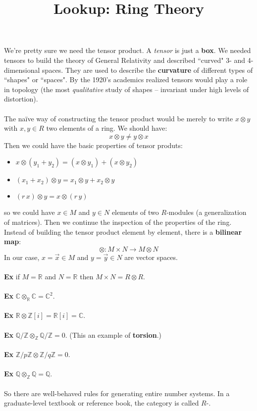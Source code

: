 \documentclass[12pt]{article}
\title{Lookup: Ring Theory}
\date{}
\begin{document}
\sffamily

\maketitle

{\fontsize{16pt}{16pt}\selectfont 

\noindent We're pretty sure we need the tensor product.  A \textit{tensor} is just a \textbf{box}.  We needed tensors to build the theory of General Relativity and described ``curved" 3- and 4-dimensional spaces.  They are used to describe the \textbf{curvature} of different types of ``shapes" or ``spaces".  By the 1920's academics realized tensors would play a role in topology (the most \textit{qualitative} study of shapes -- invariant under high levels of distortion).  \\ \\
The na\"{i}ve way of constructing the tensor product would be merely to write $x \otimes y$ with $x, y \in R$ two elements of a ring.  We should have:
$$ x \otimes y \neq y \otimes x $$
Then we could have the basic properties of tensor produts:
\begin{itemize}
\item $x \otimes (y_1 + y_2) = (x \otimes y_1) + (x \otimes y_2)$
\item $(x_1 + x_2) \otimes y = x_1 \otimes y + x_2 \otimes  y$
\item $(r\, x ) \otimes y = x \otimes (r \, y)$
\end{itemize}
so we could have $x \in M$ and $y \in N$ elements of two $R$-modules (a generalization of matrices).  Then we continue the inspection of the properties of the ring.  Instead of building the tensor product element by element, there is a \textbf{bilinear map}:
$$ \otimes : M \times N \to M \otimes N $$
In our case, $x = \vec{x} \in M$ and $ y = \vec{y} \in N$ are vector spaces. \\ \\  
\textbf{Ex} if $M = \mathbb{R}$ and $N = \mathbb{R}$ then $M \times N = R \otimes R$. \\ \\
\textbf{Ex} $\mathbb{C} \otimes_{\mathbb{R}} \mathbb{C} = \mathbb{C}^2$. \\ \\
\textbf{Ex} $\mathbb{R} \otimes \mathbb{Z}[i] = \mathbb{R}[i] = \mathbb{C}$. \\ \\
\textbf{Ex} $\mathbb{Q}/\mathbb{Z} \otimes_\mathbb{Z} \mathbb{Q}/\mathbb{Z} = 0$. (This an example of \textbf{torsion}.)\\ \\
\textbf{Ex} $\mathbb{Z}/p\mathbb{Z} \otimes \mathbb{Z}/q\mathbb{Z} = 0$. \\ \\
\textbf{Ex} $\mathbb{Q} \otimes_{\mathbb{Z}} \mathbb{Q} = \mathbb{Q}$. \\ \\
So there are well-behaved rules for generating entire number systems.  In a graduate-level textbook or reference book, the category is called $R$-.

}
\end{document}
